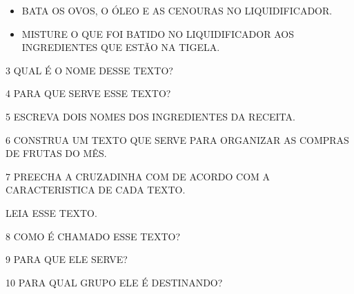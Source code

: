 \begin{escola}
\begin{itemize}
\item
  BATA OS OVOS, O ÓLEO E AS CENOURAS NO LIQUIDIFICADOR.

\item
  MISTURE O QUE FOI BATIDO NO LIQUIDIFICADOR AOS INGREDIENTES QUE ESTÃO NA TIGELA.
\end{itemize}



\num{3} QUAL É O NOME DESSE TEXTO?


\num{4} PARA QUE SERVE ESSE TEXTO?


\num{5} ESCREVA DOIS NOMES DOS INGREDIENTES DA RECEITA.


\num{6} CONSTRUA UM TEXTO QUE SERVE PARA ORGANIZAR AS COMPRAS DE FRUTAS DO MÊS.


\num{7} PREECHA A CRUZADINHA COM DE ACORDO COM A CARACTERISTICA DE CADA TEXTO.



LEIA ESSE TEXTO.



\num{8} COMO É CHAMADO ESSE TEXTO?



\num{9} PARA QUE ELE SERVE?


\num{10} PARA QUAL GRUPO ELE É DESTINANDO?




\end{escola}
